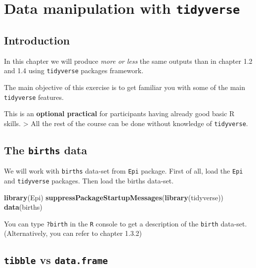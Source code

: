 \documentclass[
]{book}
\newenvironment{Shaded}{\begin{snugshade}}{\end{snugshade}}
\newcommand{\FunctionTok}[1]{\textcolor[rgb]{0.13,0.29,0.53}{\textbf{#1}}}
\newcommand{\NormalTok}[1]{#1}
\begin{document}
\chapter{\texorpdfstring{Data manipulation with \texttt{tidyverse}}{Data manipulation with tidyverse}}\label{data-manipulation-with-tidyverse}

\section{Introduction}\label{introduction-1}

In this chapter we will produce \emph{more or less} the same outputs than in chapter 1.2 and 1.4 using
\texttt{tidyverse} packages framework.

The main objective of this exercise is to get familiar you with some of the main \texttt{tidyverse} features.

This is an \textbf{optional practical} for participants having already good basic R skills.
\textgreater{} All the rest of the course can be done without knowledge of \texttt{tidyverse}.

\section{\texorpdfstring{The \texttt{births} data}{The births data}}\label{the-births-data}

We will work with \texttt{births} data-set from \texttt{Epi} package.
First of all, load the \texttt{Epi} and \texttt{tidyverse} packages.
Then load the births data-set.

\begin{Shaded}
\begin{Highlighting}[]
\FunctionTok{library}\NormalTok{(Epi)}
\FunctionTok{suppressPackageStartupMessages}\NormalTok{(}\FunctionTok{library}\NormalTok{(tidyverse))}
\FunctionTok{data}\NormalTok{(births)}
\end{Highlighting}
\end{Shaded}

You can type \texttt{?birth} in the \texttt{R} console to get a description of the \texttt{birth} data-set. (Alternatively, you can refer to chapter 1.3.2)

\section{\texorpdfstring{\texttt{tibble} vs \texttt{data.frame}}{tibble vs data.frame}}\label{tibble-vs-data.frame}
\end{document}
